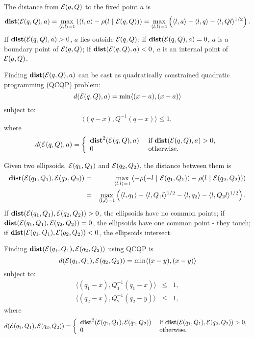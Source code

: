 The distance from $\EE(q,Q)$ to the fixed point $a$ is
\begin{equation}
{\bf dist}(\EE(q,Q),a) = \max_{\langle l,l\rangle=1}\left(\langle l,a\rangle -
\rho(l ~|~ \EE(q,Q)) \right) =
\max_{\langle l,l\rangle=1}\left(\langle l,a\rangle - \langle l,q\rangle -
\langle l,Ql\rangle^{1/2}\right). \label{dist_point}
\end{equation}
If ${\bf dist}(\EE(q,Q),a) > 0$, $a$ lies outside  $\EE(q,Q)$;
if ${\bf dist}(\EE(q,Q),a) = 0$, $a$ is a boundary point of $\EE(q,Q)$;
if ${\bf dist}(\EE(q,Q),a) < 0$, $a$ is an internal point of $\EE(q,Q)$.

Finding ${\bf dist}(\EE(q,Q),a)$ can be cast as quadratically constrained
quadratic programming (QCQP) problem:
\[ d(\EE(q,Q),a)=\min \langle (x-a), (x-a)\rangle \]
subject to:
\[ \langle (q-x), Q^{-1}(q-x)\rangle \leq 1 ,\]
where
\[ d(\EE(q,Q),a)=\left\{\begin{array}{ll}
{\bf dist}^2(\EE(q,Q),a) & \mbox{ if } {\bf dist}(\EE(q,Q),a)>0, \\
0 & \mbox{ otherwise}. \end{array}\right. \]

Given two ellipsoids, $\EE(q_1,Q_1)$ and $\EE(q_2,Q_2)$, the distance between
them is
\begin{eqnarray}
{\bf dist}(\EE(q_1,Q_1),\EE(q_2,Q_2)) & = & \max_{\langle l,l\rangle=1}
\left(-\rho(-l ~|~ \EE(q_1,Q_1)) - \rho(l ~|~ \EE(q_2,Q_2))\right) \\
& = & \max_{\langle l,l\rangle=1}\left(\langle l,q_1\rangle -
\langle l,Q_1l\rangle^{1/2} - \langle l,q_2\rangle -
\langle l,Q_2l\rangle^{1/2}\right). \label{dist_ell}
\end{eqnarray}
If ${\bf dist}(\EE(q_1,Q_1),\EE(q_2,Q_2)) > 0$,  the ellipsoids have no
common points;
if ${\bf dist}(\EE(q_1,Q_1),\EE(q_2,Q_2)) = 0$,  the ellipsoids have one
common point - they touch;
if ${\bf dist}(\EE(q_1,Q_1),\EE(q_2,Q_2)) < 0$,  the ellipsoids intersect.

Finding ${\bf dist}(\EE(q_1,Q_1),\EE(q_2,Q_2))$ using QCQP is
\[ d(\EE(q_1,Q_1),\EE(q_2,Q_2)) = \min \langle (x-y), (x-y)\rangle \]
subject to:
\begin{eqnarray*}
\langle (q_1-x), Q_1^{-1}(q_1-x)\rangle & \leq & 1,\\
\langle (q_2-x), Q_2^{-1}(q_2-y)\rangle & \leq & 1,
\end{eqnarray*}
where
\[ d(\EE(q_1,Q_1),\EE(q_2,Q_2))=\left\{\begin{array}{ll}
{\bf dist}^2(\EE(q_1,Q_1),\EE(q_2,Q_2)) &
\mbox{ if } {\bf dist}(\EE(q_1,Q_1),\EE(q_2,Q_2))>0, \\
0 & \mbox{ otherwise}. \end{array}\right. \]

